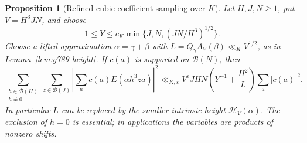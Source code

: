 \documentclass[11pt,reqno]{amsart}
\numberwithin{equation}{section}
\newtheorem{proposition}[theorem]{Proposition}
\theoremstyle{definition}
\begin{document}
\begin{proposition}[Refined cubic coefficient sampling over $K$]
\label{prop:g789-sampling}
Let $H,J,N\ge1$, put $V=H^3JN$, and choose
\[
 1\le Y\le c_K\min\{J,N,(JN/H^3)^{1/2}\}.
\]
Choose a lifted approximation $\alpha=\gamma+\beta$ with
$L=Q_\gamma A_V(\beta)\ll_K V^{1/2}$, as in
Lemma~\ref{lem:g789-height}. If $c(a)$ is supported on $\mathcal B(N)$,
then
\[
 \sum_{\substack{h\in\mathcal B(H)\\h\ne0}}
 \sum_{z\in\mathcal B(J)}
       \left|\sum_a c(a)E(\alpha h^3za)\right|^2
 \ll_{K,\varepsilon}
 V^\varepsilon JHN\left(Y^{-1}+\frac{H^2}{L}\right)
                          \sum_a|c(a)|^2.
\]
In particular $L$ can be replaced by the smaller intrinsic height
$\mathcal H_V(\alpha)$. The exclusion of $h=0$ is essential; in
applications the variables are products of nonzero shifts.
\end{proposition}
\end{document}
